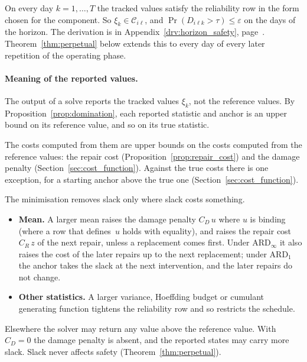 \documentclass[11pt,a4paper]{article}
\theoremstyle{plain}
\theoremstyle{definition}
\theoremstyle{remark}
\begin{document}
On every day $k = 1, \ldots, T$ the tracked values satisfy the reliability row in the form chosen for the component.
So $\xi_k \in \mathcal{C}_{i\ell}$, and $\Pr(D_{i\ell k} > \tau) \le \varepsilon$ on the days of the horizon.
The derivation is in Appendix~\ref{drv:horizon_safety}, page~\pageref{drv:horizon_safety}.
Theorem~\ref{thm:perpetual} below extends this to every day of every later repetition of the operating phase.

\paragraph{Meaning of the reported values.}
The output of a solve reports the tracked values $\xi_k$, not the reference values.
By Proposition~\ref{prop:domination}, each reported statistic and anchor is an upper bound on its reference value, and so on its true statistic.

The costs computed from them are upper bounds on the costs computed from the reference values: the repair cost (Proposition~\ref{prop:repair_cost}) and the damage penalty (Section~\ref{sec:cost_function}).
Against the true costs there is one exception, for a starting anchor above the true one (Section~\ref{sec:cost_function}).

The minimisation removes slack only where slack costs something.
\begin{itemize}
  \item \textbf{Mean.} A larger mean raises the damage penalty $C_D\,u$ where $u$ is binding (where a row that defines~$u$ holds with equality), and raises the repair cost $C_R\,z$ of the next repair, unless a replacement comes first.
    Under $\text{ARD}_\infty$ it also raises the cost of the later repairs up to the next replacement; under $\text{ARD}_1$ the anchor takes the slack at the next intervention, and the later repairs do not change.
  \item \textbf{Other statistics.} A larger variance, Hoeffding budget or cumulant generating function tightens the reliability row and so restricts the schedule.
\end{itemize}
Elsewhere the solver may return any value above the reference value.
With $C_D = 0$ the damage penalty is absent, and the reported states may carry more slack.
Slack never affects safety (Theorem~\ref{thm:perpetual}).
\end{document}
